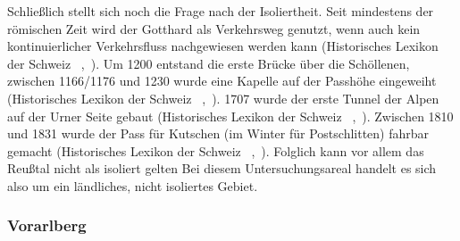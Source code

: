 Schließlich stellt sich noch die Frage nach der Isoliertheit. Seit mindestens der römischen Zeit wird der Gotthard als Verkehrsweg genutzt, wenn auch kein kontinuierlicher Verkehrsfluss nachgewiesen werden kann (Historisches Lexikon der Schweiz ~\citeyear{LexG2011},~). Um 1200 entstand die erste Brücke über die Schöllenen, zwischen 1166/1176 und 1230 wurde eine Kapelle auf der Passhöhe eingeweiht (Historisches Lexikon der Schweiz ~\citeyear{LexG2011},~). 1707 wurde der erste Tunnel der Alpen auf der Urner Seite gebaut (Historisches Lexikon der Schweiz ~\citeyear{LexG2011},~). Zwischen 1810 und 1831 wurde der Pass für Kutschen (im Winter für Postschlitten) fahrbar gemacht (Historisches Lexikon der Schweiz ~\citeyear{LexG2011},~). Folglich kann vor allem das Reußtal nicht als isoliert gelten Bei diesem Untersuchungsareal handelt es sich also um ein ländliches, nicht isoliertes Gebiet.

\subsubsection{Vorarlberg}

